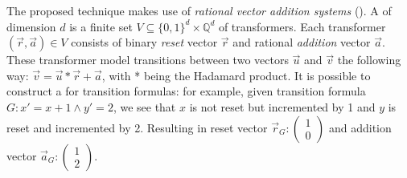 The proposed technique makes use of \textsl{rational vector addition systems} (\qvasr). A \qvasr of dimension $d$ is a finite set $V \subseteq \{0, 1\}^d \times \mathbb{Q}^d$ of transformers. Each transformer $(\vec{r}, \vec{a}) \in V$ consists of binary \textsl{reset} vector $\vec{r}$ and rational \textsl{addition} vector $\vec{a}$. These transformer model transitions between two vectors $\vec{u}$ and $\vec{v}$ the following way: $\vec{v} = \vec{u} * \vec{r} + \vec{a}$, with * being the Hadamard product. It is possible to construct a \qvasr for transition formulas: for example, given transition formula $G: x' = x + 1 \land y' = 2$, we see that $x$ is not reset but incremented by 1 and $y$ is reset and incremented by 2. Resulting in reset vector $\vec{r}_G: \begin{pmatrix} 1 \\ 0\end{pmatrix}$ and addition vector $\vec{a}_G: \begin{pmatrix} 1 \\ 2\end{pmatrix}$. \par
